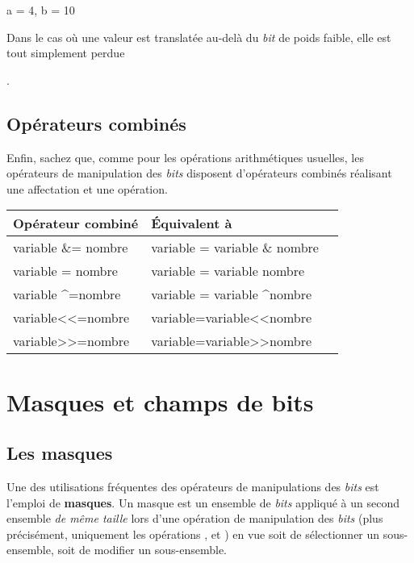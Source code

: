 \begin{C}
a = 4, b = 10
\end{C}

\begin{infobox}
  Dans le cas où une valeur est
translatée au-delà du \emph{bit} de poids faible, elle est tout
simplement perdue
\end{infobox}
.

\subsection{Opérateurs combinés}
\label{operateurs-combines}

Enfin, sachez que, comme pour les opérations arithmétiques usuelles, les
opérateurs de manipulation des \emph{bits} disposent d'opérateurs
combinés réalisant une affectation et une opération.

\begin{table}
\centering
{}
\begin{tabular}{|l|l|l|}\hline
\rowcolor{gris-tab-entete}
\textbf{Opérateur combiné} & \textbf{Équivalent à}\tabularnewline\hline
variable \&= nombre & variable = variable \& nombre\tabularnewline\hline
variable \textbar{}= nombre & variable = variable \textbar{} nombre\tabularnewline\hline
variable \^{}=nombre & variable = variable \^{}nombre\tabularnewline\hline
variable\textless{}\textless{}=nombre & variable=variable\textless{}\textless{}nombre\tabularnewline\hline
variable\textgreater{}\textgreater{}=nombre & variable=variable\textgreater{}\textgreater{}nombre\tabularnewline\hline
\end{tabular}
\end{table}

\section{Masques et champs de bits}
\label{masques-et-champs-de-bits}

\subsection{Les masques}
\label{les-masques}

Une des utilisations fréquentes des opérateurs de manipulations des
\emph{bits} est l'emploi de \textbf{masques}. Un masque est un ensemble
de \emph{bits} appliqué à un second ensemble \emph{de même taille} lors
d'une opération de manipulation des \emph{bits} (plus précisément,
uniquement les opérations \mybox{\&}, \mybox{\textbar{}} et
\mybox{\^{}}) en vue soit de sélectionner un sous-ensemble, soit de
modifier un sous-ensemble.

